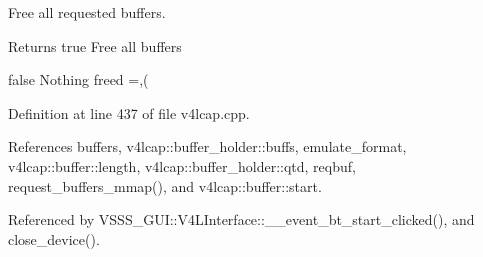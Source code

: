 Free all requested buffers. 

\begin{DoxyReturn}{Returns}
true Free all buffers 

false Nothing freed =,( 
\end{DoxyReturn}


Definition at line 437 of file v4lcap.\+cpp.



References buffers, v4lcap\+::buffer\+\_\+holder\+::buffs, emulate\+\_\+format, v4lcap\+::buffer\+::length, v4lcap\+::buffer\+\_\+holder\+::qtd, reqbuf, request\+\_\+buffers\+\_\+mmap(), and v4lcap\+::buffer\+::start.



Referenced by V\+S\+S\+S\+\_\+\+G\+U\+I\+::\+V4\+L\+Interface\+::\+\_\+\+\_\+event\+\_\+bt\+\_\+start\+\_\+clicked(), and close\+\_\+device().



